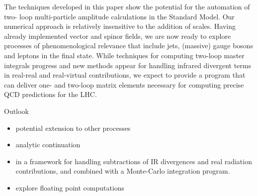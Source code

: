 

 The techniques developed in this paper show the potential for the automation of two-
 loop multi-particle amplitude calculations in the Standard Model. Our numerical approach
 is relatively insensitive to the addition of scales. Having already implemented vector and
 spinor fields, we are now ready to explore processes of phenomenological relevance that
 include jets, (massive) gauge bosons and leptons in the final state. While techniques for
 computing two-loop master integrals progress and new methods appear for handling infrared
 divergent terms in real-real and real-virtual contributions, we expect to provide a program
 that can deliver one- and two-loop matrix elements necessary for computing precise QCD
 predictions for the LHC.



Outlook
\begin{itemize}
  \item potential extension to other processes
  \item analytic continuation
  \item in a framework for handling subtractions of IR divergences and real radiation contributions,
    and combined with a Monte-Carlo integration program.
  \item explore floating point computations
\end{itemize}


